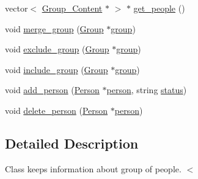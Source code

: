 \begin{DoxyCompactItemize}
vector$<$ \hyperlink{structGroup__Content}{Group\_\-Content} $\ast$ $>$ $\ast$ \hyperlink{classGroup_a8578c69459be6971dd31e76357f934dc}{get\_\-people} ()
\item 
void \hyperlink{classGroup_a2aca17525330aeaf591e0bc243a8149e}{merge\_\-group} (\hyperlink{classGroup}{Group} $\ast$\hyperlink{group__content_8h_a27517aa1480ab2d9bfe5d62e693b33eb}{group})
\item 
void \hyperlink{classGroup_a7fccd60929bd2e36db09fe37fffe0548}{exclude\_\-group} (\hyperlink{classGroup}{Group} $\ast$\hyperlink{group__content_8h_a27517aa1480ab2d9bfe5d62e693b33eb}{group})
\item 
void \hyperlink{classGroup_ac753fa2674ec19ab156645f978654961}{include\_\-group} (\hyperlink{classGroup}{Group} $\ast$\hyperlink{group__content_8h_a27517aa1480ab2d9bfe5d62e693b33eb}{group})
\item 
void \hyperlink{classGroup_afc2080f42e091f6831fd9d80e7b8f0d9}{add\_\-person} (\hyperlink{classPerson}{Person} $\ast$\hyperlink{group__content_8h_ab8664e6fd42f01eeaad084b5e20eb54e}{person}, string \hyperlink{group__content_8h_ab4d38e7365d935f2a5f1403eec29127e}{status})
\item 
void \hyperlink{classGroup_ad00847c4219c29fd3b94c6784870b629}{delete\_\-person} (\hyperlink{classPerson}{Person} $\ast$\hyperlink{group__content_8h_ab8664e6fd42f01eeaad084b5e20eb54e}{person})
\end{DoxyCompactItemize}


\subsection{Detailed Description}
Class keeps information about group of people. $<$ 

